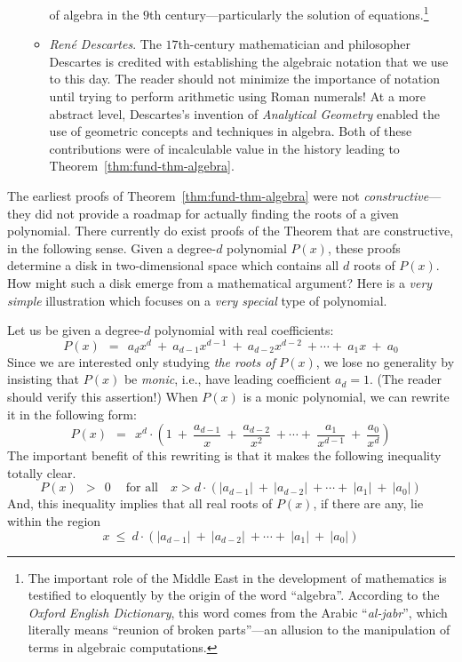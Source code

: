 \begin{itemize}
\begin{itemize}
of algebra in the $9$th century---particularly the solution of
equations.\footnote{The important role of the Middle East in the
  development of mathematics is testified to eloquently by the origin
  of the word ``algebra''.  According to the {\it Oxford English
    Dictionary}, this word comes from the Arabic ``{\it al-jabr}'',
  which literally means ``reunion of broken parts''---an allusion to
  the manipulation of terms in algebraic
  computations. }
   \item
{\it Ren\'{e} Descartes}. 
The $17$th-century mathematician and philosopher Descartes is credited
with establishing the algebraic notation that we use to this day.
The reader should not minimize the importance of notation until trying
to perform arithmetic using Roman numerals!  At a more abstract level,
Descartes's invention of {\em Analytical Geometry}
enabled the use of geometric concepts and techniques in algebra.  Both
of these contributions were of incalculable value in the history
leading to Theorem~\ref{thm:fund-thm-algebra}.
   \end{itemize}
\end{itemize}

\medskip

The earliest proofs of Theorem~\ref{thm:fund-thm-algebra} were not
{\em constructive}---they did not provide a roadmap for actually
finding the roots of a given polynomial.  There currently do exist
proofs of the Theorem that are constructive, in the following sense.
Given a degree-$d$ polynomial $P(x)$, these proofs determine a disk in
two-dimensional space which contains all $d$ roots of $P(x)$.  How
might such a disk emerge from a mathematical argument?  Here is a {\em
  very simple} illustration which focuses on a {\em very special} type
of polynomial.

Let us be given a degree-$d$ polynomial with real coefficients:
\[ P(x) \ \ = \ \ a_d x^d \ + \ a_{d-1} x^{d-1} \ + \ a_{d-2} x^{d-2}
\ + \cdots + \ a_1 x \ + \ a_0
\]
Since we are interested only studying {\em the roots of} $P(x)$, we
lose no generality by insisting that $P(x)$ be {\em monic},
 i.e., have leading coefficient $a_d = 1$.
(The reader should verify this assertion!)  When $P(x)$ is a monic
polynomial, we can rewrite it in the following form:
\[ P(x) \ \ = \ \ 
x^d \cdot \left( 1 \ + \ \frac{a_{d-1}}{x} \ + \ \frac{a_{d-2}}{x^2}
\ + \cdots + \ \frac{a_1}{x^{d-1}} \ + \ \frac{a_0}{x^d} \right)
\]
The important benefit of this rewriting is that it makes the following
inequality totally clear.
\[ P(x) \ \ > \ \ 0 \ \ \ \ \mbox{ for all } \ \ \ x >
d \cdot \left(|a_{d-1}| \ + \ |a_{d-2}|
\ + \cdots + \ |a_1| \ + \ |a_0| \right)
\]
And, this inequality implies that all real roots of $P(x)$, if there
are any, lie within the region
\[ x \ \leq \ d \cdot \left(|a_{d-1}| \ + \ |a_{d-2}| \ + \cdots +
\ |a_1| \ + \ |a_0| \right) \]


